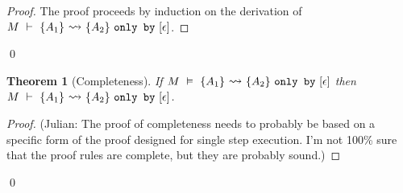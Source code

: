 \documentclass[12pt]{article}
\newcommand\trans[1]{\overset{#1}{\mathlarger{\mathlarger \leadsto}}}
\newcommand\mut[3]{#1\ \texttt{mut}\ #2.#3}
\newcommand\gives[3]{#1\ \texttt{gives}\ #2\ \texttt{to}\ #3}
\newcommand\onlyBy[3]{\{#1\}\ \trans{}\ \{#2\}\ \texttt{only by}\ [#3]}
\newtheorem{theorem}{Theorem}
\begin{document}
\begin{proof}
The proof proceeds by induction on the derivation of $M\ \vdash\ \onlyBy{A_1}{A_2}{\epsilon}$.
\end{proof}\hfill\qed
\begin{theorem}[Completeness]
If $M\ \vDash\ \onlyBy{A_1}{A_2}{\epsilon}$ then 
$M\ \vdash\ \onlyBy{A_1}{A_2}{\epsilon}$.
\end{theorem}
\begin{proof}
({\color{red}Julian: The proof of completeness needs to probably be based on a specific form of
the proof designed for single step execution. I'm not 100\% sure that the proof rules are complete, but they are probably sound.})
\end{proof}\hfill\qed


%
%
\end{document}
